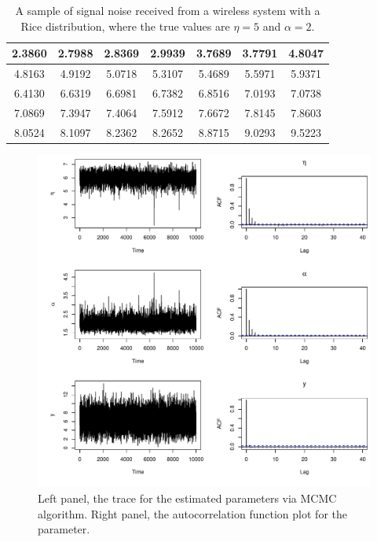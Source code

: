 \documentclass[12pt]{interact}
\theoremstyle{plain}%
\theoremstyle{definition}
\theoremstyle{remark}
\begin{document}
\begin{table}[!h]
\centering
\caption{A sample of signal noise received from a wireless system with a Rice distribution, where the true values are $\eta = 5$ and $\alpha = 2$. }
\begin{tabular}{c|c|c|c|c|c|c}
\hline
2.3860 & 2.7988 & 2.8369 & 2.9939 & 3.7689 & 3.7791 & 4.8047 \\ \hline
4.8163 & 4.9192 & 5.0718 & 5.3107 & 5.4689 & 5.5971 & 5.9371 \\ \hline
6.4130 & 6.6319 & 6.6981 & 6.7382 & 6.8516 & 7.0193 & 7.0738 \\ \hline
7.0869 & 7.3947 & 7.4064 & 7.5912 & 7.6672 & 7.8145 & 7.8603 \\ \hline
8.0524 & 8.1097 & 8.2362 & 8.2652 & 8.8715 & 9.0293 & 9.5223 \\ \hline
\end{tabular}\label{table3}

\end{table}


\begin{figure}[!h]
\centering
\includegraphics[scale=0.8]{tsplot.pdf}
\caption{ Left panel, the trace for the estimated parameters via MCMC algorithm. Right panel, the autocorrelation function plot for the parameter.}
\label{graf3}
\end{figure}
\end{document}
